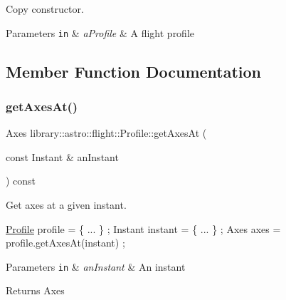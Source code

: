 Copy constructor. 


\begin{DoxyParams}[1]{Parameters}
\mbox{\tt in}  & {\em a\+Profile} & A flight profile \\
\hline
\end{DoxyParams}


\subsection{Member Function Documentation}
\mbox{\label{classlibrary_1_1astro_1_1flight_1_1_profile_ae23fce614c9d1de3a4e8800eb4e3e03f}} 
\subsubsection{\texorpdfstring{get\+Axes\+At()}{getAxesAt()}}
{\footnotesize\ttfamily Axes library\+::astro\+::flight\+::\+Profile\+::get\+Axes\+At (\begin{DoxyParamCaption}\item[{const Instant \&}]{an\+Instant }\end{DoxyParamCaption}) const}



Get axes at a given instant. 


\begin{DoxyCode}
\hyperlink{classlibrary_1_1astro_1_1flight_1_1_profile_a34d66fdddf3eda9a3fed036d6b9a4363}{Profile} profile = \{ ... \} ;
Instant instant = \{ ... \} ;
Axes axes = profile.getAxesAt(instant) ;
\end{DoxyCode}



\begin{DoxyParams}[1]{Parameters}
\mbox{\tt in}  & {\em an\+Instant} & An instant \\
\hline
\end{DoxyParams}
\begin{DoxyReturn}{Returns}
Axes 
\end{DoxyReturn}
\mbox{\label{classlibrary_1_1astro_1_1flight_1_1_profile_a0c26ed37c9328fa58a12b723316c485c}} 
